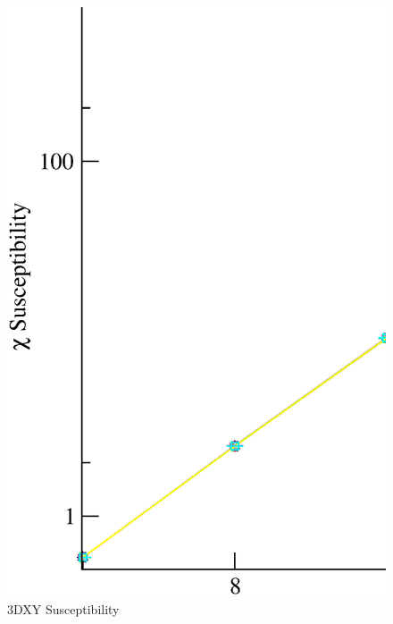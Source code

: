 \begin{figure}[!htpb]
  \centering
  \includegraphics[width=\textwidth]{./plots/3DXY/vsL/Susceptibility.eps}
  \caption{3DXY Susceptibility}
\end{figure}


